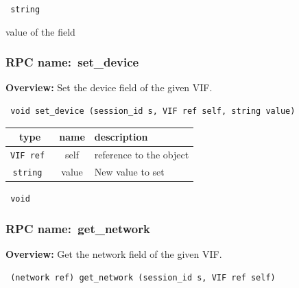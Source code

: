 \vspace{0.3cm}

{\tt 
string
}


value of the field
\vspace{0.3cm}
\vspace{0.3cm}
\vspace{0.3cm}
\subsubsection{RPC name:~set\_device}

{\bf Overview:} 
Set the device field of the given VIF.

\begin{verbatim} void set_device (session_id s, VIF ref self, string value)\end{verbatim}



 
\vspace{0.3cm}
\begin{tabular}{|c|c|p{7cm}|}
 \hline
{\bf type} & {\bf name} & {\bf description} \\ \hline
{\tt VIF ref } & self & reference to the object \\ \hline 

{\tt string } & value & New value to set \\ \hline 

\end{tabular}

\vspace{0.3cm}

{\tt 
void
}



\vspace{0.3cm}
\vspace{0.3cm}
\vspace{0.3cm}
\subsubsection{RPC name:~get\_network}

{\bf Overview:} 
Get the network field of the given VIF.

\begin{verbatim} (network ref) get_network (session_id s, VIF ref self)\end{verbatim}



